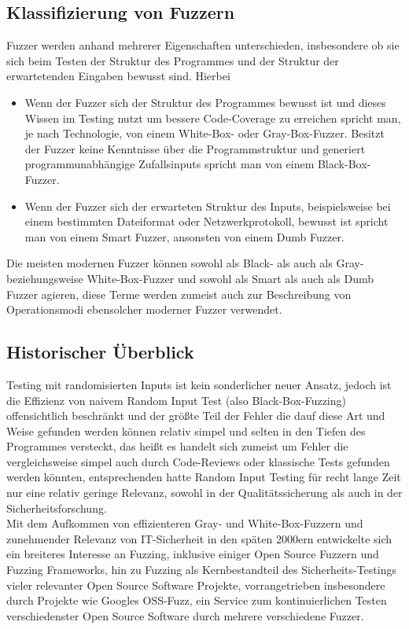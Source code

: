\documentclass[a4paper]{article}
\begin{document}
\subsection{Klassifizierung von Fuzzern}
Fuzzer werden anhand mehrerer Eigenschaften unterschieden, insbesondere ob sie sich beim Testen der Struktur des Programmes und der Struktur der erwartetenden Eingaben bewusst sind. Hierbei
\begin{itemize}
    \item Wenn der Fuzzer sich der Struktur des Programmes bewusst ist und dieses Wissen im Testing nutzt um bessere Code-Coverage zu erreichen spricht man, je nach Technologie, von einem White-Box- oder Gray-Box-Fuzzer. Besitzt der Fuzzer keine Kenntnisse über die Programmstruktur und generiert programmunabhängige Zufallsinputs spricht man von einem Black-Box-Fuzzer.
    \item Wenn der Fuzzer sich der erwarteten Struktur des Inputs, beispielsweise bei einem bestimmten Dateiformat oder Netzwerkprotokoll, bewusst ist spricht man von einem Smart Fuzzer, ansonsten von einem Dumb Fuzzer.
\end{itemize}
Die meisten modernen Fuzzer können sowohl als Black- als auch als Gray- beziehungsweise White-Box-Fuzzer und sowohl als Smart als auch als Dumb Fuzzer agieren, diese Terme werden zumeist auch zur Beschreibung von Operationsmodi ebensolcher moderner Fuzzer verwendet.

\subsection{Historischer Überblick}
Testing mit randomisierten Inputs ist kein sonderlicher neuer Ansatz, jedoch ist die Effizienz von naivem Random Input Test (also Black-Box-Fuzzing) offensichtlich beschränkt und der größte Teil der Fehler die dauf diese Art und Weise gefunden werden können relativ simpel und selten in den Tiefen des Programmes versteckt, das heißt es handelt sich zumeist um Fehler die vergleichsweise simpel auch durch Code-Reviews oder klassische Tests gefunden werden könnten, entsprechenden hatte Random Input Testing für recht lange Zeit nur eine relativ geringe Relevanz, sowohl in der Qualitätssicherung als auch in der Sicherheitsforschung.\\
Mit dem Aufkommen von effizienteren Gray- und White-Box-Fuzzern und zunehmender Relevanz von IT-Sicherheit in den späten 2000ern entwickelte sich ein breiteres Interesse an Fuzzing, inklusive einiger Open Source Fuzzern und Fuzzing Frameworks, hin zu Fuzzing als Kernbestandteil des Sicherheits-Testings vieler relevanter Open Source Software Projekte, vorrangetrieben insbesondere durch Projekte wie Googles OSS-Fuzz, ein Service zum kontinuierlichen Testen verschiedenster Open Source Software durch mehrere verschiedene Fuzzer.
\end{document}
